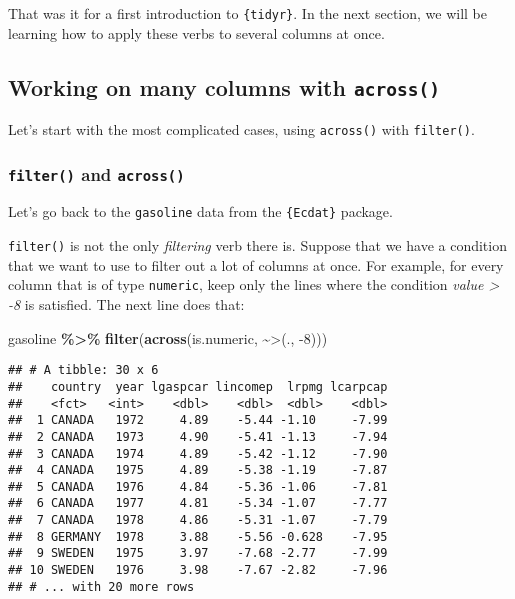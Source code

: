 \documentclass[
]{article}
\newenvironment{Shaded}{\begin{snugshade}}{\end{snugshade}}
\newcommand{\DataTypeTok}[1]{\textcolor[rgb]{0.13,0.29,0.53}{#1}}
\newcommand{\DecValTok}[1]{\textcolor[rgb]{0.00,0.00,0.81}{#1}}
\newcommand{\KeywordTok}[1]{\textcolor[rgb]{0.13,0.29,0.53}{\textbf{#1}}}
\newcommand{\NormalTok}[1]{#1}
\newcommand{\OperatorTok}[1]{\textcolor[rgb]{0.81,0.36,0.00}{\textbf{#1}}}
\newcommand{\StringTok}[1]{\textcolor[rgb]{0.31,0.60,0.02}{#1}}
\begin{document}
That was it for a first introduction to \texttt{\{tidyr\}}. In the next section, we will be learning
how to apply these verbs to several columns at once.

\hypertarget{working-on-many-columns-with-across}{%
\subsection{\texorpdfstring{Working on many columns with \texttt{across()}}{Working on many columns with across()}}\label{working-on-many-columns-with-across}}

Let's start with the most complicated cases, using \texttt{across()} with \texttt{filter()}.

\hypertarget{filter-and-across}{%
\subsubsection{\texorpdfstring{\texttt{filter()} and \texttt{across()}}{filter() and across()}}\label{filter-and-across}}

Let's go back to the \texttt{gasoline} data from the \texttt{\{Ecdat\}} package.

\texttt{filter()} is not the only \emph{filtering} verb there is. Suppose that we have a condition that we want
to use to filter out a lot of columns at once. For example, for every column that is of type
\texttt{numeric}, keep only the lines where the condition \emph{value \textgreater{} -8} is satisfied. The next line does
that:

\begin{Shaded}
\begin{Highlighting}[]
\NormalTok{gasoline }\OperatorTok{\%\textgreater{}\%}
\StringTok{  }\KeywordTok{filter}\NormalTok{(}\KeywordTok{across}\NormalTok{(is.numeric, }\OperatorTok{\textasciitilde{}}\StringTok{\textasciigrave{}}\DataTypeTok{\textgreater{}}\StringTok{\textasciigrave{}}\NormalTok{(., }\DecValTok{{-}8}\NormalTok{)))}
\end{Highlighting}
\end{Shaded}

\begin{verbatim}
## # A tibble: 30 x 6
##    country  year lgaspcar lincomep  lrpmg lcarpcap
##    <fct>   <int>    <dbl>    <dbl>  <dbl>    <dbl>
##  1 CANADA   1972     4.89    -5.44 -1.10     -7.99
##  2 CANADA   1973     4.90    -5.41 -1.13     -7.94
##  3 CANADA   1974     4.89    -5.42 -1.12     -7.90
##  4 CANADA   1975     4.89    -5.38 -1.19     -7.87
##  5 CANADA   1976     4.84    -5.36 -1.06     -7.81
##  6 CANADA   1977     4.81    -5.34 -1.07     -7.77
##  7 CANADA   1978     4.86    -5.31 -1.07     -7.79
##  8 GERMANY  1978     3.88    -5.56 -0.628    -7.95
##  9 SWEDEN   1975     3.97    -7.68 -2.77     -7.99
## 10 SWEDEN   1976     3.98    -7.67 -2.82     -7.96
## # ... with 20 more rows
\end{verbatim}
\end{document}
